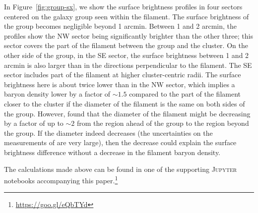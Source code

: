 In Figure~\ref{fig:group-sx}, we show the surface brightness profiles in four sectors centered on the galaxy group seen within the filament. The surface brightness of the group becomes negligible beyond 1 arcmin. Between 1 and 2 arcmin, the profiles show the NW sector being significantly brighter than the other three; this sector covers the part of the filament between the group and the cluster. On the other side of the group, in the SE sector, the surface brightness between 1 and 2 arcmin is also larger than in the directions perpendicular to the filament. The SE sector includes part of the filament at higher cluster-centric radii. The surface brightness here is about twice lower than in the NW sector, which implies a baryon density lower by a factor of $\sim 1.5$ compared to the part of the filament closer to the cluster if the diameter of the filament is the same on both sides of the group. However, \citet{Jauzac2012} found that the diameter of the filament might be decreasing by a factor of up to $\sim 2$ from the region ahead of the group to the region beyond the group. If the diameter indeed decreases (the uncertainties on the measurements of \citet{Jauzac2012} are very large), then the decrease could explain the surface brightness difference without a decrease in the filament baryon density.

The calculations made above can be found in one of the supporting \textsc{Jupyter} notebooks accompanying this paper.\footnote{\url{https://goo.gl/eQbTYd}}





